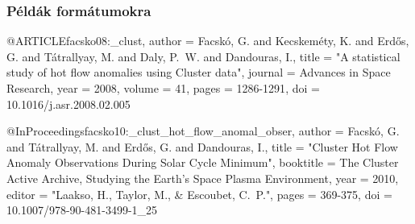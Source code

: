\documentclass[aspectratio=169]{beamer}
\begin{document}

\begin{frame}
\frametitle{Példák  formátumokra}

\begin{verbatim*}
@ARTICLE{facsko08:_clust,
   author = {{Facsk{\'o}}, G. and {Kecskem{\'e}ty}, K. and 
{Erd{\H o}s}, G. and {T{\'a}trallyay}, M. and 
{Daly}, P.~W. and {Dandouras}, I.},
    title = "{A statistical study of hot flow 
anomalies using Cluster data}",
  journal = {Advances in Space Research},
     year = 2008,
   volume = 41,
    pages = {1286-1291},
      doi = {10.1016/j.asr.2008.02.005}
}
\end{verbatim*}
\vfill


\begin{verbatim*}
@Book{laakso10:_clust_activ_archiv,
  editor = 	 {{Laakso}, H. and {Taylor}, M. 
and {Escoubet}, C.~P.}
  title = 	 {The Cluster Active Archive},
  publisher = 	 {Springer Science+Business Media B.V.},
  year = 	 2010,
  note = {Astrophysics and Space Science Proceedings, 
ISBN 978-90-481-3498-4}},
  doi = {10.1007/978-90-481-3499-1}
}
\end{verbatim*}
\vfill


\begin{verbatim*}
@InProceedings{facsko10:_clust_hot_flow_anomal_obser,
   author = {{Facsk{\'o}}, G. and {T{\'a}trallyay}, M. and 
{Erd{\H o}s}, G. and {Dandouras}, I.},
    title = "{Cluster Hot Flow Anomaly Observations 
During Solar Cycle Minimum}",
booktitle = {The Cluster Active Archive, Studying 
the Earth's Space Plasma Environment},
     year = 2010,
   editor = "{Laakso, H., Taylor, M., \& Escoubet, C.~P.}",
    pages = {369-375},
      doi = {10.1007/978-90-481-3499-1\_25}
}
\end{verbatim*}
\vfill
\end{frame}

\end{document}
